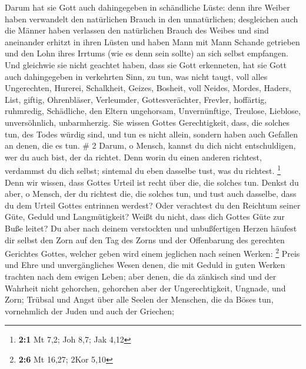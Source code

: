  Darum hat sie Gott auch dahingegeben in schändliche Lüste:
denn ihre Weiber haben verwandelt den natürlichen Brauch in den
unnatürlichen;  desgleichen auch die Männer haben verlassen
den natürlichen Brauch des Weibes und sind aneinander erhitzt in ihren
Lüsten und haben Mann mit Mann Schande getrieben und den Lohn ihres
Irrtums (wie es denn sein sollte) an sich selbst empfangen.
 Und gleichwie sie nicht geachtet haben, dass sie Gott
erkenneten, hat sie Gott auch dahingegeben in verkehrten Sinn, zu tun,
was nicht taugt,  voll alles Ungerechten, Hurerei,
Schalkheit, Geizes, Bosheit, voll Neides, Mordes, Haders, List, giftig,
Ohrenbläser,  Verleumder, Gottesverächter, Frevler,
hoffärtig, ruhmredig, Schädliche, den Eltern ungehorsam, 
Unvernünftige, Treulose, Lieblose, unversöhnlich, unbarmherzig.
 Sie wissen Gottes Gerechtigkeit, dass, die solches tun,
des Todes würdig sind, und tun es nicht allein, sondern haben auch
Gefallen an denen, die es tun. \# 2  Darum, o Mensch, kannst
du dich nicht entschuldigen, wer du auch bist, der da richtet. Denn
worin du einen anderen richtest, verdammst du dich selbst; sintemal du
eben dasselbe tust, was du richtest. \footnote{\textbf{2:1} Mt 7,2; Joh
  8,7; Jak 4,12}  Denn wir wissen, dass Gottes Urteil ist
recht über die, die solches tun.  Denkst du aber, o Mensch,
der du richtest die, die solches tun, und tust auch dasselbe, dass du
dem Urteil Gottes entrinnen werdest?  Oder verachtest du den
Reichtum seiner Güte, Geduld und Langmütigkeit? Weißt du nicht, dass
dich Gottes Güte zur Buße leitet?  Du aber nach deinem
verstockten und unbußfertigen Herzen häufest dir selbst den Zorn auf den
Tag des Zorns und der Offenbarung des gerechten Gerichtes Gottes,
 welcher geben wird einem jeglichen nach seinen Werken:
\footnote{\textbf{2:6} Mt 16,27; 2Kor 5,10}  Preis und Ehre
und unvergängliches Wesen denen, die mit Geduld in guten Werken trachten
nach dem ewigen Leben;  aber denen, die da zänkisch sind und
der Wahrheit nicht gehorchen, gehorchen aber der Ungerechtigkeit,
Ungnade, und Zorn;  Trübsal und Angst über alle Seelen der
Menschen, die da Böses tun, vornehmlich der Juden und auch der Griechen;


